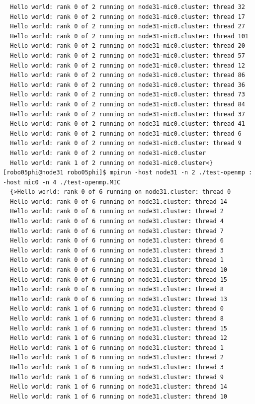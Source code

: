 \documentclass[pscyr,10pt]{hedlab}
\begin{document}
\begin{lstlisting}
  Hello world: rank 0 of 2 running on node31-mic0.cluster: thread 32
  Hello world: rank 0 of 2 running on node31-mic0.cluster: thread 17
  Hello world: rank 0 of 2 running on node31-mic0.cluster: thread 27
  Hello world: rank 0 of 2 running on node31-mic0.cluster: thread 101
  Hello world: rank 0 of 2 running on node31-mic0.cluster: thread 20
  Hello world: rank 0 of 2 running on node31-mic0.cluster: thread 57
  Hello world: rank 0 of 2 running on node31-mic0.cluster: thread 12
  Hello world: rank 0 of 2 running on node31-mic0.cluster: thread 86
  Hello world: rank 0 of 2 running on node31-mic0.cluster: thread 36
  Hello world: rank 0 of 2 running on node31-mic0.cluster: thread 73
  Hello world: rank 0 of 2 running on node31-mic0.cluster: thread 84
  Hello world: rank 0 of 2 running on node31-mic0.cluster: thread 37
  Hello world: rank 0 of 2 running on node31-mic0.cluster: thread 41
  Hello world: rank 0 of 2 running on node31-mic0.cluster: thread 6
  Hello world: rank 0 of 2 running on node31-mic0.cluster: thread 9
  Hello world: rank 0 of 2 running on node31-mic0.cluster
  Hello world: rank 1 of 2 running on node31-mic0.cluster<}
[robo05phi@node31 robo05phi]$ mpirun -host node31 -n 2 ./test-openmp : -host mic0 -n 4 ./test-openmp.MIC
  {>Hello world: rank 0 of 6 running on node31.cluster: thread 0
  Hello world: rank 0 of 6 running on node31.cluster: thread 14
  Hello world: rank 0 of 6 running on node31.cluster: thread 2
  Hello world: rank 0 of 6 running on node31.cluster: thread 4
  Hello world: rank 0 of 6 running on node31.cluster: thread 7
  Hello world: rank 0 of 6 running on node31.cluster: thread 6
  Hello world: rank 0 of 6 running on node31.cluster: thread 3
  Hello world: rank 0 of 6 running on node31.cluster: thread 1
  Hello world: rank 0 of 6 running on node31.cluster: thread 10
  Hello world: rank 0 of 6 running on node31.cluster: thread 15
  Hello world: rank 0 of 6 running on node31.cluster: thread 8
  Hello world: rank 0 of 6 running on node31.cluster: thread 13
  Hello world: rank 1 of 6 running on node31.cluster: thread 0
  Hello world: rank 1 of 6 running on node31.cluster: thread 8
  Hello world: rank 1 of 6 running on node31.cluster: thread 15
  Hello world: rank 1 of 6 running on node31.cluster: thread 12
  Hello world: rank 1 of 6 running on node31.cluster: thread 1
  Hello world: rank 1 of 6 running on node31.cluster: thread 2
  Hello world: rank 1 of 6 running on node31.cluster: thread 3
  Hello world: rank 1 of 6 running on node31.cluster: thread 9
  Hello world: rank 1 of 6 running on node31.cluster: thread 14
  Hello world: rank 1 of 6 running on node31.cluster: thread 10

\end{lstlisting}
\end{document}
